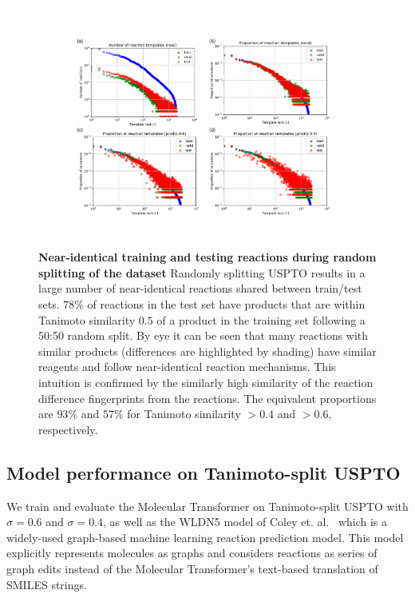 \begin{figure}[ht!]
    \centering
    \includegraphics[width=\textwidth]{Chapters/Transformer/Figs/rxn_distribution.pdf}
    \caption{\label{fig:rxn_dist} \textbf{Near-identical training and testing reactions during random splitting of the dataset} Randomly splitting USPTO results in a large number of near-identical reactions shared between train/test sets. $78\%$ of reactions in the test set have products that are within Tanimoto similarity $0.5$ of a product in the training set following a 50:50 random split. By eye it can be seen that many reactions with similar products (differences are highlighted by shading) have similar reagents and follow near-identical reaction mechanisms. This intuition is confirmed by the similarly high similarity of the reaction difference fingerprints from the reactions. The equivalent proportions are $93\%$ and $57\%$ for Tanimoto similarity $>0.4$ and $>0.6$, respectively.}
\end{figure}

\subsection{Model performance on Tanimoto-split USPTO}
We train and evaluate the Molecular Transformer on Tanimoto-split USPTO with $\sigma = 0.6$ and $\sigma = 0.4$, as well as the WLDN5 model of Coley et. al.~\cite{Coley19WLDN5} which is a widely-used graph-based machine learning reaction prediction model. This model explicitly represents molecules as graphs and considers reactions as series of graph edits instead of the Molecular Transformer's text-based translation of SMILES strings.

